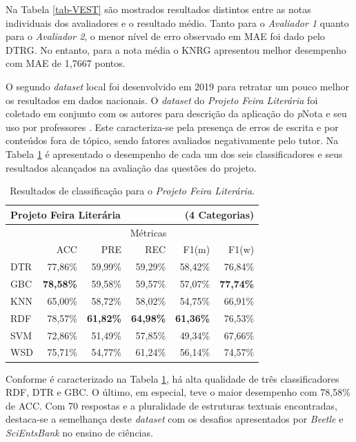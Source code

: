 Na Tabela \ref{tab-VEST} são mostrados resultados distintos entre as notas individuais dos avaliadores e o resultado médio. Tanto para o \textit{Avaliador 1} quanto para o \textit{Avaliador 2}, o menor nível de erro observado em MAE foi dado pelo DTRG. No entanto, para a nota média o KNRG apresentou melhor desempenho com MAE de 1,7667 pontos.

O segundo \textit{dataset} local foi desenvolvido em 2019 para retratar um pouco melhor os resultados em dados nacionais. O \textit{dataset} do \textit{Projeto Feira Literária} foi coletado em conjunto com os autores para descrição da aplicação do \textit{p}Nota e seu uso por professores \cite{nascimento2020}. Este caracteriza-se pela presença de erros de escrita e por conteúdos fora de tópico, sendo fatores avaliados negativamente pelo tutor. Na Tabela \ref{tab-FINDES} é apresentado o desempenho de cada um dos seis classificadores e seus resultados alcançados na avaliação das questões do projeto.


\begin{table}[!h]
\centering
\caption{Resultados de classificação para o \textit{Projeto Feira Literária}.}
\label{tab-FINDES}
\begin{tabular}{l r r r r r}
    \hline
    \multicolumn{4}{l}{\textbf{Projeto Feira Literária}} & \multicolumn{2}{r}{(4 Categorias)} \\ \hline
     & \multicolumn{5}{c}{M{\'e}tricas} \\ \cline{2-6}

     & ACC & PRE & REC & F1(m) & F1(w) \\ \cline{2-6}
    DTR & 77,86\% & 59,99\% & 59,29\% & 58,42\% & 76,84\% \\
    GBC & \textbf{78,58\%} & 59,58\% & 59,57\% & 57,07\% & \textbf{77,74\%} \\ 
    KNN & 65,00\% & 58,72\% & 58,02\% & 54,75\% & 66,91\% \\
    RDF & 78,57\% & \textbf{61,82\%} & \textbf{64,98\%} & \textbf{61,36\%} & 76,53\% \\
    SVM & 72,86\% & 51,49\% & 57,85\% & 49,34\% & 67,66\% \\
    WSD & 75,71\% & 54,77\% & 61,24\% & 56,14\% & 74,57\% \\

    \hline
    \hline
\end{tabular}
\end{table}

Conforme é caracterizado na Tabela \ref{tab-FINDES}, há alta qualidade de três classificadores RDF, DTR e GBC. O último, em especial, teve o maior desempenho com 78,58\% de ACC. Com 70 respostas e a pluralidade de estruturas textuais encontradas, destaca-se a semelhança deste \textit{dataset} com os desafios apresentados por \textit{Beetle} e \textit{SciEntsBank} no ensino de ciências.

